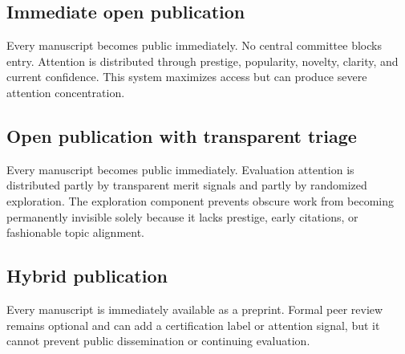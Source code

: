 \subsection{Immediate open publication}

Every manuscript becomes public immediately. No central committee blocks entry. Attention is distributed through prestige, popularity, novelty, clarity, and current confidence. This system maximizes access but can produce severe attention concentration.

\subsection{Open publication with transparent triage}

Every manuscript becomes public immediately. Evaluation attention is distributed partly by transparent merit signals and partly by randomized exploration. The exploration component prevents obscure work from becoming permanently invisible solely because it lacks prestige, early citations, or fashionable topic alignment.

\subsection{Hybrid publication}

Every manuscript is immediately available as a preprint. Formal peer review remains optional and can add a certification label or attention signal, but it cannot prevent public dissemination or continuing evaluation.
